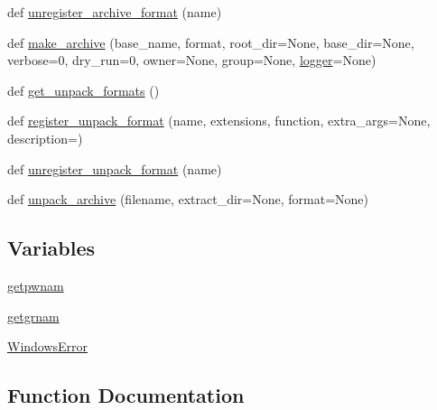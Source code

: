 \begin{DoxyCompactItemize}
\item 
def \hyperlink{namespacepip_1_1__vendor_1_1distlib_1_1__backport_1_1shutil_af1641136218016c61ea3d7379436394f}{unregister\+\_\+archive\+\_\+format} (name)
\item 
def \hyperlink{namespacepip_1_1__vendor_1_1distlib_1_1__backport_1_1shutil_afbd5c41aeb3398006126295674e2ba62}{make\+\_\+archive} (base\+\_\+name, format, root\+\_\+dir=None, base\+\_\+dir=None, verbose=0, dry\+\_\+run=0, owner=None, group=None, \hyperlink{namespacepip_1_1__vendor_1_1distlib_a125e21a0644bed21ada612dbd41579ce}{logger}=None)
\item 
def \hyperlink{namespacepip_1_1__vendor_1_1distlib_1_1__backport_1_1shutil_a453818fd244425a96ba15ed03fe7f9a0}{get\+\_\+unpack\+\_\+formats} ()
\item 
def \hyperlink{namespacepip_1_1__vendor_1_1distlib_1_1__backport_1_1shutil_ada1fa01f86638140228be5fcc8d9ddd3}{register\+\_\+unpack\+\_\+format} (name, extensions, function, extra\+\_\+args=None, description=\textquotesingle{}\textquotesingle{})
\item 
def \hyperlink{namespacepip_1_1__vendor_1_1distlib_1_1__backport_1_1shutil_a61777d8cdfecf8f5cd336ace2e2c285c}{unregister\+\_\+unpack\+\_\+format} (name)
\item 
def \hyperlink{namespacepip_1_1__vendor_1_1distlib_1_1__backport_1_1shutil_a6944b8125b511c84213d186e05dd6187}{unpack\+\_\+archive} (filename, extract\+\_\+dir=None, format=None)
\end{DoxyCompactItemize}
\subsection*{Variables}
\begin{DoxyCompactItemize}
\item 
\hyperlink{namespacepip_1_1__vendor_1_1distlib_1_1__backport_1_1shutil_a03c891d143c23a0470cfc3768d5cacb3}{getpwnam}
\item 
\hyperlink{namespacepip_1_1__vendor_1_1distlib_1_1__backport_1_1shutil_ad4748222d7a65dd4e61131f8e937c9a2}{getgrnam}
\item 
\hyperlink{namespacepip_1_1__vendor_1_1distlib_1_1__backport_1_1shutil_a4062974c02eaee764b49dbc898412238}{Windows\+Error}
\end{DoxyCompactItemize}


\subsection{Function Documentation}
\mbox{\label{namespacepip_1_1__vendor_1_1distlib_1_1__backport_1_1shutil_aaa01ac0561f19e4e36b246949e3cff19}} 
